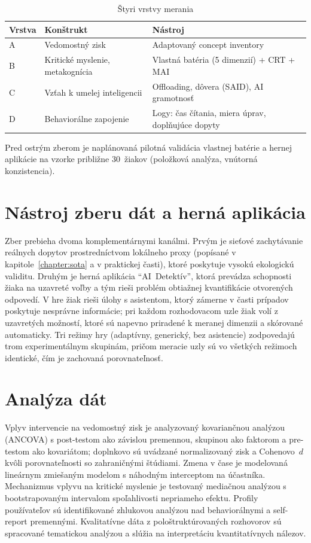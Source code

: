 \begin{aibar}
\begin{table}[H]
\centering
\caption{Štyri vrstvy merania}
\label{tab:vrstvy}
\small
\begin{tabularx}{\textwidth}{|l|X|X|}
\hline
\textbf{Vrstva} & \textbf{Konštrukt} & \textbf{Nástroj} \\
\hline
A & Vedomostný zisk & Adaptovaný concept inventory \\
\hline
B & Kritické myslenie, metakognícia & Vlastná batéria (5 dimenzií) + CRT + MAI \\
\hline
C & Vzťah k umelej inteligencii & Offloading, dôvera (SAID), AI gramotnosť \\
\hline
D & Behaviorálne zapojenie & Logy: čas čítania, miera úprav, doplňujúce dopyty \\
\hline
\end{tabularx}
\end{table}

Pred ostrým zberom je naplánovaná pilotná validácia vlastnej batérie a hernej
aplikácie na vzorke približne 30~žiakov (položková analýza, vnútorná
konzistencia).


\section{Nástroj zberu dát a herná aplikácia}
\label{sec:tool}

Zber prebieha dvoma komplementárnymi kanálmi. Prvým je sieťové zachytávanie
reálnych dopytov prostredníctvom lokálneho proxy (popísané v
kapitole~\ref{chapter:sota} a v praktickej časti), ktoré poskytuje vysokú
ekologickú validitu. Druhým je herná aplikácia ``AI~Detektív'', ktorá
prevádza schopnosti žiaka na uzavreté voľby a tým rieši problém obtiažnej
kvantifikácie otvorených odpovedí. V hre žiak rieši úlohy s asistentom, ktorý
zámerne v časti prípadov poskytuje nesprávne informácie; pri každom
rozhodovacom uzle žiak volí z uzavretých možností, ktoré sú napevno priradené
k meranej dimenzii a skórované automaticky. Tri režimy hry (adaptívny,
generický, bez asistencie) zodpovedajú trom experimentálnym skupinám, pričom
meracie uzly sú vo všetkých režimoch identické, čím je zachovaná
porovnateľnosť.


\section{Analýza dát}
\label{sec:analysis}

Vplyv intervencie na vedomostný zisk je analyzovaný kovariančnou analýzou
(ANCOVA) s post-testom ako závislou premennou, skupinou ako faktorom a
pre-testom ako kovariátom; doplnkovo sú uvádzané normalizovaný zisk a
Cohenovo~$d$ kvôli porovnateľnosti so zahraničnými štúdiami. Zmena v čase je
modelovaná lineárnym zmiešaným modelom s náhodným interceptom na účastníka.
Mechanizmus vplyvu na kritické myslenie je testovaný mediačnou analýzou s
bootstrapovaným intervalom spoľahlivosti nepriameho efektu. Profily
používateľov sú identifikované zhlukovou analýzou nad behaviorálnymi a
self-report premennými. Kvalitatívne dáta z pološtruktúrovaných rozhovorov sú
spracované tematickou analýzou a slúžia na interpretáciu kvantitatívnych
nálezov.



\end{aibar}
